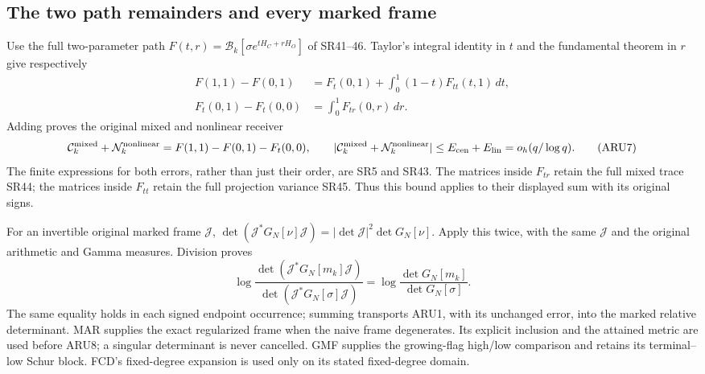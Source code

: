 \subsection{The two path remainders and every marked frame}
Use the full two-parameter path
$F(t,r)=\mathcal B_k[\sigma e^{tH_C+rH_O}]$ of SR41--46.
Taylor's integral identity in $t$ and the fundamental theorem in $r$
give respectively
\[
\begin{split}
 F(1,1)-F(0,1)&=F_t(0,1)+
                  \int_0^1(1-t)F_{tt}(t,1)\,dt,\\
 F_t(0,1)-F_t(0,0)&=\int_0^1F_{tr}(0,r)\,dr.
\end{split}\tag{ARU6}
\]
Adding proves the original mixed and nonlinear receiver
\[
 \mathcal C_k^{\rm mixed}+\mathcal N_k^{\rm nonlinear}
 =F(1,1)-F(0,1)-F_t(0,0),\qquad
 |\mathcal C_k^{\rm mixed}+\mathcal N_k^{\rm nonlinear}|
 \le E_{\rm cen}+E_{\rm lin}=o_h(q/\log q).
 \tag{ARU7}
\]
The finite expressions for both errors, rather than just their order,
are SR5 and SR43. The matrices inside $F_{tr}$ retain the full
mixed trace SR44; the matrices inside $F_{tt}$ retain the full
projection variance SR45. Thus this bound applies to their displayed
sum with its original signs.

For an invertible original marked frame $\mathcal J$,
$\det(\mathcal J^*G_N[\nu]\mathcal J)=
 |\det\mathcal J|^2\det G_N[\nu]$. Apply this twice, with the same
$\mathcal J$ and the original arithmetic and Gamma measures. Division
proves
\[
 \log\frac{\det(\mathcal J^*G_N[m_k]\mathcal J)}
                 {\det(\mathcal J^*G_N[\sigma]\mathcal J)}
 =\log\frac{\det G_N[m_k]}{\det G_N[\sigma]}.
 \tag{ARU8}
\]
The same equality holds in each signed endpoint occurrence; summing
transports ARU1, with its unchanged error, into the marked relative
determinant. MAR supplies the exact regularized frame when the naive
frame degenerates. Its explicit inclusion and the attained metric are
used before ARU8; a singular determinant is never cancelled.
GMF supplies the growing-flag high/low comparison and retains its
terminal--low Schur block. FCD's fixed-degree expansion is used only
on its stated fixed-degree domain.

